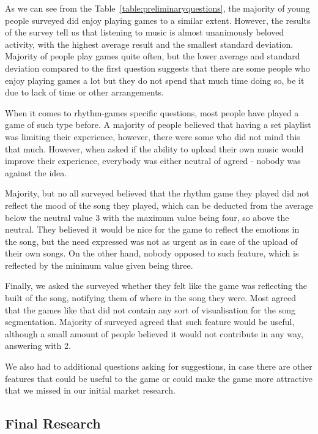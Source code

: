 As we can see from the Table~\ref{table:preliminaryquestions}, the majority of young people surveyed did enjoy playing games to a similar extent. However, the results of the survey tell us that listening to music is almost unanimously beloved activity, with the highest average result and the smallest standard deviation. 
Majority of people play games quite often, but the lower average and standard deviation compared to the first question suggests that there are some people who enjoy playing games a lot but they do not spend that much time doing so, be it due to lack of time or other arrangements. 

When it comes to rhythm-games specific questions, most people have played a game of such type before. A majority of people believed that having a set playlist was limiting their experience, however, there were some who did not mind this that much. However, when asked if the ability to upload their own music would improve their experience, everybody was either neutral of agreed - nobody was against the idea. 

Majority, but no all surveyed believed that the rhythm game they played did not reflect the mood of the song they played, which can be deducted from the average below the neutral value 3 with the maximum value being four, so above the neutral. They believed it would be nice for the game to reflect the emotions in the song, but the need expressed was not as urgent as in case of the upload of their own songs. On the other hand, nobody opposed to such feature, which is reflected by the minimum value given being three.

Finally, we asked the surveyed whether they felt like the game was reflecting the built of the song, notifying them of where in the song they were. Most agreed that the games like that did not contain any sort of visualisation for the song segmentation. Majority of surveyed agreed that such feature would be useful, although a small amount of people believed it would not contribute in any way, answering with 2.

We also had to additional questions asking for suggestions, in case there are other features that could be useful to the game or could make the game more attractive that we missed in our initial market research. 

\subsection*{Final Research}

